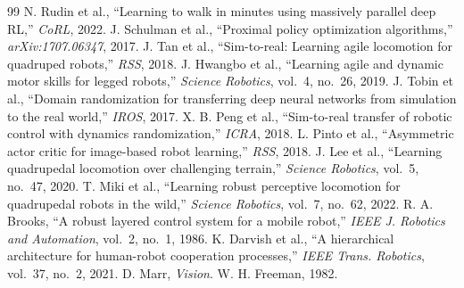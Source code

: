 \documentclass[conference]{IEEEtran}
\begin{document}
\begin{thebibliography}{99}
\footnotesize
{} N. Rudin et al., ``Learning to walk in minutes using massively parallel deep
RL,'' \emph{CoRL}, 2022.
 J. Schulman et al., ``Proximal policy optimization algorithms,''
\emph{arXiv:1707.06347}, 2017.
 J. Tan et al., ``Sim-to-real: Learning agile locomotion for quadruped robots,''
\emph{RSS}, 2018.
 J. Hwangbo et al., ``Learning agile and dynamic motor skills for legged
robots,'' \emph{Science Robotics}, vol.~4, no.~26, 2019.
 J. Tobin et al., ``Domain randomization for transferring deep neural networks
from simulation to the real world,'' \emph{IROS}, 2017.
 X. B. Peng et al., ``Sim-to-real transfer of robotic control with dynamics
randomization,'' \emph{ICRA}, 2018.
 L. Pinto et al., ``Asymmetric actor critic for image-based robot learning,''
\emph{RSS}, 2018.
 J. Lee et al., ``Learning quadrupedal locomotion over challenging terrain,''
\emph{Science Robotics}, vol.~5, no.~47, 2020.
 T. Miki et al., ``Learning robust perceptive locomotion for quadrupedal robots
in the wild,'' \emph{Science Robotics}, vol.~7, no.~62, 2022.
 R. A. Brooks, ``A robust layered control system for a mobile robot,''
\emph{IEEE J. Robotics and Automation}, vol.~2, no.~1, 1986.
 K. Darvish et al., ``A hierarchical architecture for human-robot cooperation
processes,'' \emph{IEEE Trans. Robotics}, vol.~37, no.~2, 2021.
 D. Marr, \emph{Vision}. W. H. Freeman, 1982.
\end{thebibliography}
\end{document}
